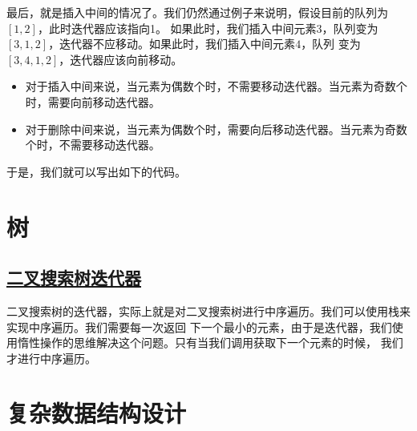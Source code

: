 \documentclass[../../main.tex]{subfiles}
\begin{document}

最后，就是插入中间的情况了。我们仍然通过例子来说明，假设目前的队列为$[1,2]$，此时迭代器应该指向1。
如果此时，我们插入中间元素$3$，队列变为$[3,1,2]$，迭代器不应移动。如果此时，我们插入中间元素$4$，队列
变为$[3,4,1,2]$，迭代器应该向前移动。

\begin{itemize}
  \item 对于插入中间来说，当元素为偶数个时，不需要移动迭代器。当元素为奇数个时，需要向前移动迭代器。
  \item 对于删除中间来说，当元素为偶数个时，需要向后移动迭代器。当元素为奇数个时，不需要移动迭代器。
\end{itemize}

于是，我们就可以写出如下的代码。



\section{树}

\subsection{\href{https://leetcode.cn/problems/binary-search-tree-iterator/}{二叉搜索树迭代器}}

二叉搜索树的迭代器，实际上就是对二叉搜索树进行中序遍历。我们可以使用栈来实现中序遍历。我们需要每一次返回
下一个最小的元素，由于是迭代器，我们使用惰性操作的思维解决这个问题。只有当我们调用获取下一个元素的时候，
我们才进行中序遍历。



\section{复杂数据结构设计}
\end{document}
